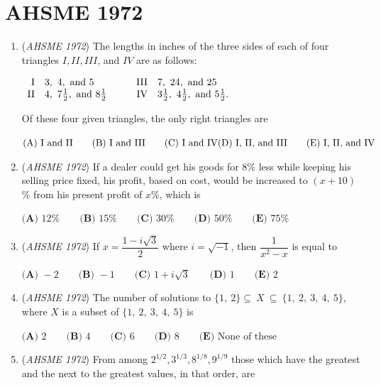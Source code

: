 \section{AHSME 1972}
        \begin{enumerate}
        	\item (\textit{AHSME 1972}) The lengths in inches of the three sides of each of four triangles $I, II, III$, and $IV$ are as follows: 


 $\begin{array}{rlrl} \hbox{I}& 3,\ 4,\ \hbox{and}\ 5\qquad & \hbox{III}& 7,\ 24,\ \hbox{and}\ 25\\  \hbox{II}& 4,\ 7\frac{1}{2},\ \hbox{and}\ 8\frac{1}{2}\qquad & \hbox{IV}& 3\frac{1}{2},\ 4\frac{1}{2},\ \hbox{and}\ 5\frac{1}{2}.\end{array}$


 Of these four given triangles, the only right triangles are 


 $\text{(A)  I and II}\qquad  \text{(B)  I and III}\qquad \text{(C)  I and IV} \quad \\ \text{(D)  I, II, and III} \qquad \text{(E)  I, II, and IV }$


	\item (\textit{AHSME 1972}) If a dealer could get his goods for $8$\% less while keeping his selling price fixed, 
his profit, based on cost, would be increased to $(x+10)$\% from his present profit of $x$\%, which is


 $\textbf{(A) }12\%\qquad \textbf{(B) }15\%\qquad \textbf{(C) }30\%\qquad \textbf{(D) }50\%\qquad  \textbf{(E) }75\%$


	\item (\textit{AHSME 1972}) If $x=\dfrac{1-i\sqrt{3}}{2}$ where $i=\sqrt{-1}$, then $\dfrac{1}{x^2-x}$ is equal to


 $\textbf{(A) }-2\qquad \textbf{(B) }-1\qquad \textbf{(C) }1+i\sqrt{3}\qquad \textbf{(D) }1\qquad  \textbf{(E) }2$


	\item (\textit{AHSME 1972}) The number of solutions to $\{1,~2\}\subseteq~X~\subseteq~\{1,~2,~3,~4,~5\}$, where $X$ is a subset of $\{1,~2,~3,~4,~5\}$ is


 $\textbf{(A) }2\qquad \textbf{(B) }4\qquad \textbf{(C) }6\qquad \textbf{(D) }8\qquad  \textbf{(E) }\text{None of these}$


	\item (\textit{AHSME 1972}) From among $2^{1/2}, 3^{1/3}, 8^{1/8}, 9^{1/9}$ those which have the greatest and the next to the greatest values, in that order, are 



\end{enumerate}

